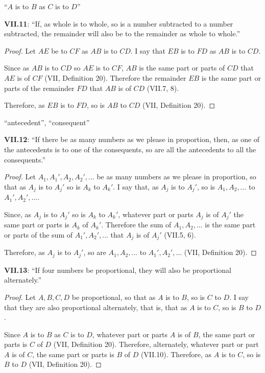 \documentclass{article}
\begin{document}
``$A$ is to $B$ as $C$ is to $D$''

\textbf{VII.11}: ``If, as whole is to whole, so is a number subtracted to a number subtracted, the remainder will also be to the remainder as whole to whole.''

\begin{proof}
Let $AE$ be to $CF$ as $AB$ is to $CD$. I say that $EB$ is to $FD$ as $AB$ is to $CD$.

Since as $AB$ is to $CD$ so $AE$ is to $CF$, $AB$ is the same part or parts of $CD$ that
$AE$ is of $CF$ (VII, Definition 20). Therefore
the remainder $EB$ is the same part or parts of the remainder $FD$ that $AB$ is of $CD$ (VII.7, 8).

Therefore, as $EB$ is to $FD$, so is $AB$ to $CD$ (VII, Definition 20).
\end{proof}

``antecedent'', ``consequent''

\textbf{VII.12}: ``If there be as many numbers as we please in proportion, then, as one of the antecedents is to one of the consequents, so are all the antecedents to all the consequents.''

\begin{proof}
Let $A_1,A_1',A_2,A_2',\ldots$ be as many numbers as we please in proportion, so that as $A_j$ is to $A_j'$ so is $A_k$ to $A_k'$.
I say that, as $A_j$ is to $A_j'$, so is $A_1,A_2,\ldots$ to $A_1',A_2',\ldots$.

Since, as $A_j$ is to $A_j'$ so is $A_k$ to $A_k'$, whatever part or parts $A_j$ is of $A_j'$ the same part or parts is $A_k$ of $A_k'$.
Therefore the sum of $A_1,A_2,\ldots$ is the same part or parts of the sum of $A_1',A_2',\ldots$ that 
$A_j$ is of $A_j'$ (VII.5, 6). 

Therefore, as $A_j$ is to $A_j'$, so are $A_1,A_2,\ldots$ to $A_1',A_2',\ldots$ (VII, Definition 20).
\end{proof}



\textbf{VII.13}: ``If four numbers be proportional, they will also be proportional alternately.''

\begin{proof}
Let $A,B,C,D$ be proportional, so that as $A$ is to $B$, so is $C$ to $D$. I say that
they are also proportional alternately, that is, that 
as $A$ is to $C$, so is $B$ to $D$.

Since $A$ is to $B$ as $C$ is to $D$, whatever part or parts $A$ is of $B$, the same part or parts is $C$ of $D$ (VII, Definition 20).
Therefore, alternately, whatever part or part $A$ is of $C$, the same part or parts is $B$ of $D$ (VII.10).
Therefore, as $A$ is to $C$, so is $B$ to $D$ (VII, Definition 20).
\end{proof}
\end{document}

